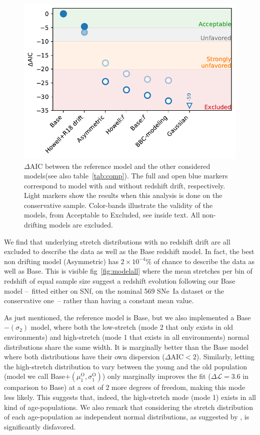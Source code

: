 \documentclass[]{aa} %
\newcommand{\mr}[1]{{\textcolor[rgb]{0.60,0.10,0.6}{#1}}}
\newcommand{\nn}[1]{{\textcolor[rgb]{1, 0.27, 0}{#1}}}
\begin{document}
\begin{figure}
    \centering
    \includegraphics[width=\linewidth]{Article_figures/mod_comp.pdf}
    \caption{$\Delta$AIC between the reference model and the other considered
    models(see also table~\ref{tab:comp}). The full and open blue markers
correspond to model with and without redshift drift, respectively. Light markers
show the results when this analysis is done on the conservative sample.
Color-bands illustrate the validity of the models, from Acceptable to Excluded,
see inside text. All non-drifting models are excluded.}
    \label{fig:mod_comp}
\end{figure}

\mr{We find that underlying stretch distributions with no redshift drift are all
    excluded to describe the data as well as the Base redshift model. In fact,
    the best non drifting model (Asymmetric) has $2\times10^{-4}\%$ of chance to
    describe the data as well as Base. This is visible fig~\ref{fig:modelall}
    where the mean stretches per bin of redshift of equal sample size suggest a
    redshift evolution following our Base model --~fitted either on SNf, on the
    nominal 569 SNe~Ia dataset or the conservative one~-- rather than having a
constant mean value.}

\mr{As just mentioned, the \nn{reference model is Base}, but we also implemented
    a Base$-(\sigma_2)$ model, where both the low-stretch (mode 2 that only
    exists in old environments) and high-stretch (mode 1 that exists in all
    environments) normal distributions share the same width. It is marginally
    better than the Base model where both distributions have their own
    \nn{dispersion} ($\Delta \mathrm{AIC}<2$). Similarly, letting the
    high-stretch distribution to vary between the young and the old population
    (\nn{model we call} Base$+(\mu_1^{\mathrm{O}}, \sigma_1^{\mathrm{O}})$) only
    marginally improves the fit ($\Delta\mathcal{L}=3.6$ in comparison to Base)
    at a cost of 2 more degrees of freedom, making this mode less likely. This
    suggests that, indeed, the high-stretch mode (mode 1) exists in all kind of
    age-populations. We also remark that considering the stretch distribution of
    each age-population as independent normal distributions, as suggested by
\cite{howell2007}, is \nn{significantly disfavored}.}
\end{document}
